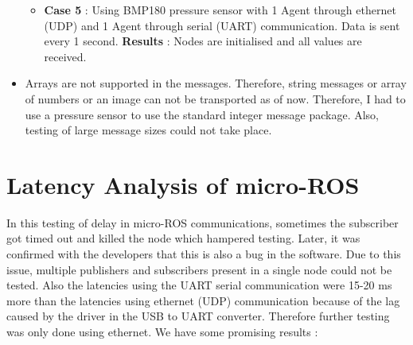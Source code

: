 \documentclass[%
xelatex,
	oneside,		%
	12pt,			%
	parskip=half,	%
	abstracton,
	chapterprefix=true%
    appendixprefix=true]
{scrbook}
\begin{document}
\begin{itemize}
\begin{itemize}
\item {\bfseries Case 5} : Using BMP180 pressure sensor with 1 Agent through ethernet (UDP) and 1 Agent through serial (UART) communication.
Data is sent every 1 second. \linebreak
{\bfseries Results} : Nodes are initialised and all values are received.
\end{itemize}
\item Arrays are not supported in the messages. Therefore, string messages or array of numbers or an image can not be transported as of now. Therefore, I had to use a pressure sensor to use the standard integer message package. Also, testing of large message sizes could not take place.

\end{itemize}
\section{Latency Analysis of micro-ROS}
\vspace*{0.5cm}
In this testing of delay in micro-ROS communications, sometimes the subscriber got timed out and killed the node which hampered testing. Later, it was confirmed with the developers that this is also a bug in the software. Due to this issue, multiple publishers and subscribers present in a single node could not be tested. Also the latencies using the UART serial communication were 15-20 ms more than the latencies using ethernet (UDP) communication because of the lag caused by the driver in the USB to UART converter. Therefore further testing was only done using ethernet. We have some promising results :
\end{document}
